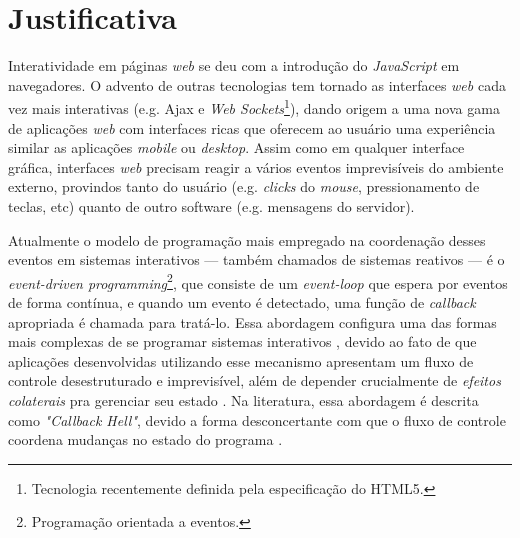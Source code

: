 \section{Justificativa}\label{ljustificativa}

Interatividade em páginas \textit{web} se deu com a
introdução do \textit{JavaScript} em navegadores.
O advento de outras tecnologias tem tornado as interfaces
\textit{web} cada vez mais interativas
(e.g. Ajax e \textit{Web Sockets}\footnote{
  Tecnologia recentemente definida pela especificação do HTML5.
}),
dando origem a uma nova gama de aplicações \textit{web}
com interfaces ricas que oferecem ao usuário uma experiência
similar as aplicações \textit{mobile} ou \textit{desktop}.
Assim como em qualquer interface gráfica, interfaces \textit{web}
precisam reagir a vários eventos imprevisíveis do ambiente
externo, provindos tanto do usuário (e.g. \textit{clicks}
do \textit{mouse}, pressionamento de teclas, etc)
quanto de outro software (e.g. mensagens do servidor).

Atualmente o modelo de programação mais empregado na
coordenação desses eventos em sistemas interativos
--- também chamados de sistemas reativos --- é o
\textit{event-driven programming}\footnote{
  Programação orientada a eventos.
},
que consiste de um \textit{event-loop} que espera por
eventos de forma contínua, e quando um evento é detectado,
uma função de \textit{callback} apropriada é chamada para
tratá-lo.
Essa abordagem configura uma das formas mais complexas de se
programar sistemas interativos \cite{
  edwards2009coherent,
  maier2010deprecating,
  reppy1992higher},
devido ao fato de que aplicações desenvolvidas utilizando
esse mecanismo apresentam um fluxo de controle desestruturado
e imprevisível, além de depender crucialmente de
\textit{efeitos colaterais\footnotemark} pra
gerenciar seu estado \cite{
  meyerovich2009flapjax,
  muller2015interactive,
  muller2015practical}.
Na literatura, essa abordagem é descrita como \textit{"Callback Hell"},
devido a forma desconcertante com que o fluxo de controle coordena
mudanças no estado do programa \cite[p.~2]{edwards2009coherent}.

